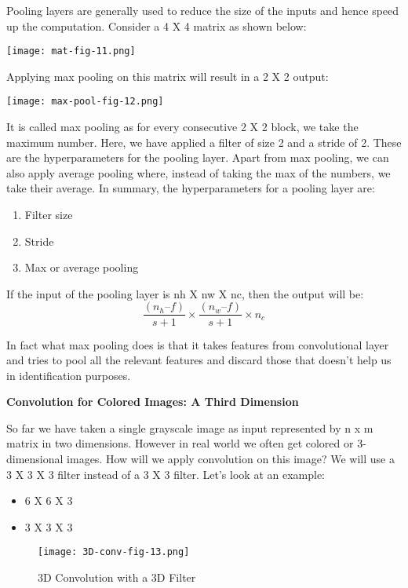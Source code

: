 Pooling layers are generally used to reduce the size of the inputs and hence speed up the computation. Consider a 4 X 4 matrix as shown below:

\texttt{[image: mat-fig-11.png]}

Applying max pooling on this matrix will result in a 2 X 2 output:

\texttt{[image: max-pool-fig-12.png]}

It is called max pooling as for every consecutive 2 X 2 block, we take the maximum number. Here, we have applied a filter of size 2 and a stride of 2. These are the hyperparameters for the pooling layer. Apart from max pooling, we can also apply average pooling where, instead of taking the max of the numbers, we take their average. In summary, the hyperparameters for a pooling layer are:

\begin{enumerate}
  \item Filter size
  \item Stride
  \item Max or average pooling
\end{enumerate}


If the input of the pooling layer is nh X nw X nc, then the output will be:
$$ \frac{(n_h – f)}{s + 1} \times \frac{(n_w – f)}{s + 1} \times n_c $$

In fact what max pooling does is that it takes features from convolutional layer and tries to pool all the relevant features and discard those that doesn’t help us in identification purposes.

\begin{flushleft}
  \textbf{Convolution for Colored Images: A Third Dimension}
\end{flushleft}

So far we have taken a single grayscale image as input represented by n x m matrix in two dimensions. However in real world we often get colored or 3-dimensional images. How will we apply convolution on this image? We will use a 3 X 3 X 3 filter instead of a 3 X 3 filter. Let’s look at an example:

\begin{itemize}
  \item 6 X 6 X 3
  \item 3 X 3 X 3
\end{itemize}

\begin{figure}
  \caption{3D Convolution with a 3D Filter}
  \texttt{[image: 3D-conv-fig-13.png]}
\end{figure}

